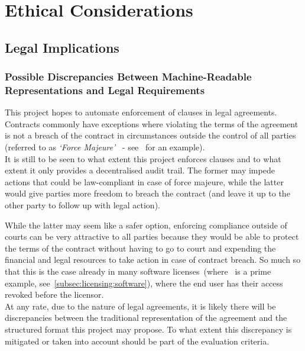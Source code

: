 
\chapter{Ethical Considerations}\label{ch:ethical}


\section{Legal Implications}\label{sec:legal-implications}

\subsection{Possible Discrepancies Between Machine-Readable Representations and Legal Requirements}
\label{subsec:legal-discrepancies}

This project hopes to automate enforcement of clauses in legal agreements.
Contracts commonly have exceptions where violating the terms of the agreement is not a breach of the
contract in circumstances outside the control of all parties (referred to as \textit{`Force
Majeure'}~\cite{forceMajeureDefinition} - see~\cite[]{jetbrainsEduLicence} for an
example).\\

It is still to be seen to what extent this project enforces clauses and to what extent it only
provides a decentralised audit trail.
The former may impede actions that could be law-compliant in case of force majeure, while the latter
would give parties more freedom to breach the contract (and leave it up to the other party to follow
up with legal action).

While the latter may seem like a safer option, enforcing compliance outside of courts can be very
attractive to all parties because they would be able to protect the terms of the contract without
having to go to court and expending the financial and legal resources to take action in case of
contract breach.
So much so that this is the case already in many software licenses~(where~\cite{jetbrainsEduLicence}
is a prime example, see~\ref{subsec:licensing:software}), where the end user has their access
revoked before the licensor.\\

At any rate, due to the nature of legal agreements, it is likely there will be discrepancies
between the traditional representation of the agreement and the structured format this project
may propose.
To what extent this discrepancy is mitigated or taken into account should be part of the
evaluation criteria.

